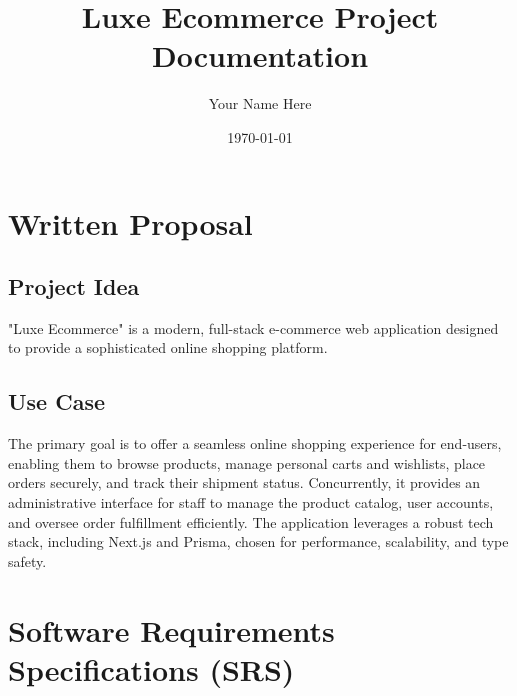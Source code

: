 \documentclass{article}
\title{Luxe Ecommerce Project Documentation}
\author{Your Name Here} %
\date{\today}
\begin{document}
\maketitle
\tableofcontents
\newpage

\section{Written Proposal}

\subsection{Project Idea}
"Luxe Ecommerce" is a modern, full-stack e-commerce web application designed to provide a sophisticated online shopping platform.

\subsection{Use Case}
The primary goal is to offer a seamless online shopping experience for end-users, enabling them to browse products, manage personal carts and wishlists, place orders securely, and track their shipment status. Concurrently, it provides an administrative interface for staff to manage the product catalog, user accounts, and oversee order fulfillment efficiently. The application leverages a robust tech stack, including Next.js and Prisma, chosen for performance, scalability, and type safety.

\section{Software Requirements Specifications (SRS)}
\end{document}
